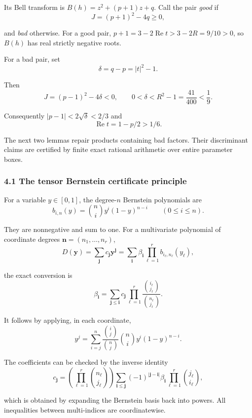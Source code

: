 \documentclass[
  11pt,
  a4paper,
]{article}
\begin{document}
Its Bell transform is \(B(h)=z^2+(p+1)z+q\). Call the pair \emph{good}
if
\nopagebreak
\[
J=(p+1)^2-4q\geq0,
\]

and \emph{bad} otherwise. For a good pair,
\(p+1=3-2\operatorname{Re}t>3-2R=9/10>0\), so \(B(h)\) has real strictly
negative roots.

For a bad pair, set
\nopagebreak
\[
\delta=q-p=|t|^2-1.
\]

Then
\nopagebreak
\[
J=(p-1)^2-4\delta<0,
\qquad
0<\delta<R^2-1=\frac{41}{400}<\frac19.
\]

Consequently \(|p-1|<2\sqrt\delta<2/3\) and
\nopagebreak
\[
\operatorname{Re}t=1-p/2>1/6.\tag{9}
\]

The next two lemmas repair products containing bad factors. Their
discriminant claims are certified by finite exact rational arithmetic
over entire parameter boxes.

\subsubsection{4.1 The tensor Bernstein certificate
principle}\label{the-tensor-bernstein-certificate-principle}

For a variable \(y\in[0,1]\), the degree-\(n\) Bernstein polynomials are
\nopagebreak
\[
b_{i,n}(y)=\binom ni y^i(1-y)^{n-i}\qquad(0\leq i\leq n).
\]

They are nonnegative and sum to one. For a multivariate polynomial of
coordinate degrees \(\mathbf n=(n_1,\ldots,n_r)\),
\nopagebreak
\[
D(\mathbf y)=\sum_{\mathbf j}c_{\mathbf j}\mathbf y^{\mathbf j}
=\sum_{\mathbf i}\beta_{\mathbf i}
\prod_{\ell=1}^r b_{i_\ell,n_\ell}(y_\ell),
\]

the exact conversion is
\nopagebreak
\[
\beta_{\mathbf i}
=\sum_{\mathbf j\leq\mathbf i}c_{\mathbf j}
\prod_{\ell=1}^r
\frac{\binom{i_\ell}{j_\ell}}{\binom{n_\ell}{j_\ell}}.\tag{10}
\]

It follows by applying, in each coordinate,
\nopagebreak
\[
y^j=\sum_{i=j}^n
\frac{\binom ij}{\binom nj}\binom ni y^i(1-y)^{n-i}.
\]

The coefficients can be checked by the inverse identity
\nopagebreak
\[
c_{\mathbf j}
=\left(\prod_{\ell=1}^r\binom{n_\ell}{j_\ell}\right)
\sum_{\mathbf i\leq\mathbf j}
(-1)^{|\mathbf j-\mathbf i|}\beta_{\mathbf i}
\prod_{\ell=1}^r\binom{j_\ell}{i_\ell},\tag{11}
\]

which is obtained by expanding the Bernstein basis back into powers. All
inequalities between multi-indices are coordinatewise.
\end{document}
